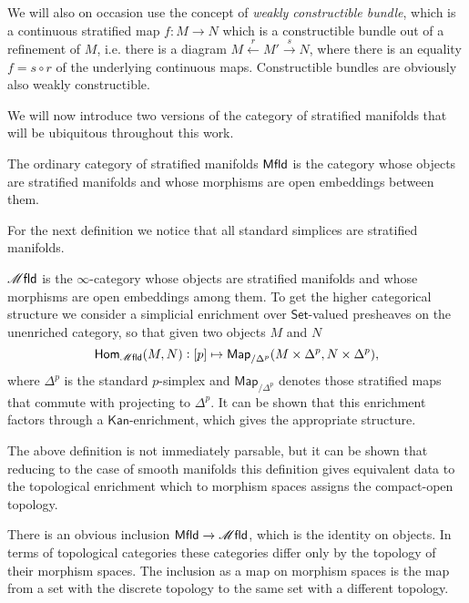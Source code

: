 \documentclass[../text]{subfiles}
\begin{document}
\begin{remark}
    We will also on occasion use the concept of \emph{weakly constructible bundle}, which is a continuous stratified map $f: M \rightarrow N$ which is a constructible bundle out of a refinement of $M$, i.e. there is a diagram $M \xleftarrow{r} M' \xrightarrow{s} N$, where there is an equality $f = s \circ r$ of the underlying continuous maps. Constructible bundles are obviously also weakly constructible.
\end{remark}

We will now introduce two versions of the category of stratified manifolds that will be ubiquitous throughout this work.

\begin{definition}
    The ordinary category of stratified manifolds $\mfld[r]$ is the category whose objects are stratified manifolds and whose morphisms are open embeddings between them.
\end{definition}

For the next definition we notice that all standard simplices are stratified manifolds.

\begin{definition}
    $\mfld$ is the $\infty$-category whose objects are stratified manifolds and whose morphisms are open embeddings among them. To get the higher categorical structure we consider a simplicial enrichment over $\mathsf{Set}$-valued presheaves on the unenriched category, so that given two objects $M$ and $N$
    \begin{equation}
        \mathsf{Hom}_{\mfld} (M, N): [p] \mapsto \mathsf{Map}_{/\Delta^p} (M \times \Delta^p, N \times \Delta^p),
    \end{equation}
    where $\Delta^p$ is the standard $p$-simplex and $\mathsf{Map}_{/\Delta^p}$ denotes those stratified maps that commute with projecting to $\Delta^p$. It can be shown that this enrichment factors through a $\mathsf{Kan}$-enrichment, which gives the appropriate structure.
\end{definition}

\begin{remark}
    The above definition is not immediately parsable, but it can be shown that reducing to the case of smooth manifolds this definition gives equivalent data to the topological enrichment which to morphism spaces assigns the compact-open topology. 
\end{remark}

\begin{remark}
    There is an obvious inclusion $\mfld[r] \xrightarrow{} \mfld$, which is the identity on objects. In terms of topological categories these categories differ only by the topology of their morphism spaces. The inclusion as a map on morphism spaces is the map from a set with the discrete topology to the same set with a different topology.
\end{remark}
\end{document}
